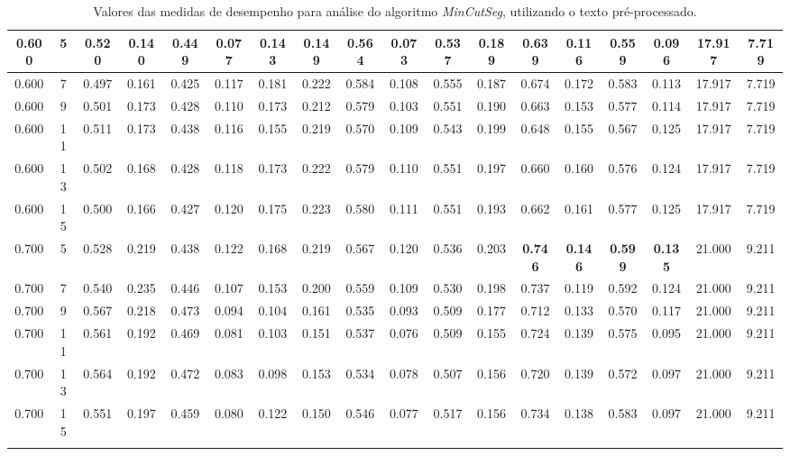 \begin{longtable}[c]{|c|c|c|c|c|c|c|c|c|c|c|c|c|c|c|c|c|c|}
  0.600 & 5 & 0.520 & 0.140 & 0.449 & 0.077 & 0.143 & 0.149 & 0.564 & 0.073 & 0.537 & 0.189 & 0.639 & 0.116 & 0.559 & 0.096 & 17.917 & 7.719  \\ \hline 
  0.600 & 7 & 0.497 & 0.161 & 0.425 & 0.117 & 0.181 & 0.222 & 0.584 & 0.108 & 0.555 & 0.187 & 0.674 & 0.172 & 0.583 & 0.113 & 17.917 & 7.719  \\ \hline 
  0.600 & 9 & 0.501 & 0.173 & 0.428 & 0.110 & 0.173 & 0.212 & 0.579 & 0.103 & 0.551 & 0.190 & 0.663 & 0.153 & 0.577 & 0.114 & 17.917 & 7.719  \\ \hline 
  0.600 & 11 & 0.511 & 0.173 & 0.438 & 0.116 & 0.155 & 0.219 & 0.570 & 0.109 & 0.543 & 0.199 & 0.648 & 0.155 & 0.567 & 0.125 & 17.917 & 7.719  \\ \hline 
  0.600 & 13 & 0.502 & 0.168 & 0.428 & 0.118 & 0.173 & 0.222 & 0.579 & 0.110 & 0.551 & 0.197 & 0.660 & 0.160 & 0.576 & 0.124 & 17.917 & 7.719  \\ \hline 
  0.600 & 15 & 0.500 & 0.166 & 0.427 & 0.120 & 0.175 & 0.223 & 0.580 & 0.111 & 0.551 & 0.193 & 0.662 & 0.161 & 0.577 & 0.125 & 17.917 & 7.719  \\ \hline 
  0.700 & 5 & 0.528 & 0.219 & 0.438 & 0.122 & 0.168 & 0.219 & 0.567 & 0.120 & 0.536 & 0.203 & \cellcolor{gray!20} \textbf{0.746} & \cellcolor{gray!20} \textbf{0.146} & \cellcolor{gray!20} \textbf{0.599} & \cellcolor{gray!20} \textbf{0.135} & 21.000 & 9.211  \\ \hline 
  0.700 & 7 & 0.540 & 0.235 & 0.446 & 0.107 & 0.153 & 0.200 & 0.559 & 0.109 & 0.530 & 0.198 & 0.737 & 0.119 & 0.592 & 0.124 & 21.000 & 9.211  \\ \hline 
  0.700 & 9 & 0.567 & 0.218 & 0.473 & 0.094 & 0.104 & 0.161 & 0.535 & 0.093 & 0.509 & 0.177 & 0.712 & 0.133 & 0.570 & 0.117 & 21.000 & 9.211  \\ \hline 
  0.700 & 11 & 0.561 & 0.192 & 0.469 & 0.081 & 0.103 & 0.151 & 0.537 & 0.076 & 0.509 & 0.155 & 0.724 & 0.139 & 0.575 & 0.095 & 21.000 & 9.211  \\ \hline 
  0.700 & 13 & 0.564 & 0.192 & 0.472 & 0.083 & 0.098 & 0.153 & 0.534 & 0.078 & 0.507 & 0.156 & 0.720 & 0.139 & 0.572 & 0.097 & 21.000 & 9.211  \\ \hline 
  0.700 & 15 & 0.551 & 0.197 & 0.459 & 0.080 & 0.122 & 0.150 & 0.546 & 0.077 & 0.517 & 0.156 & 0.734 & 0.138 & 0.583 & 0.097 & 21.000 & 9.211  \\ \hline 
 \caption{Valores das medidas de desempenho para análise do algoritmo \textit{MinCutSeg}, utilizando o texto pré-processado.}
 \end{longtable} 

